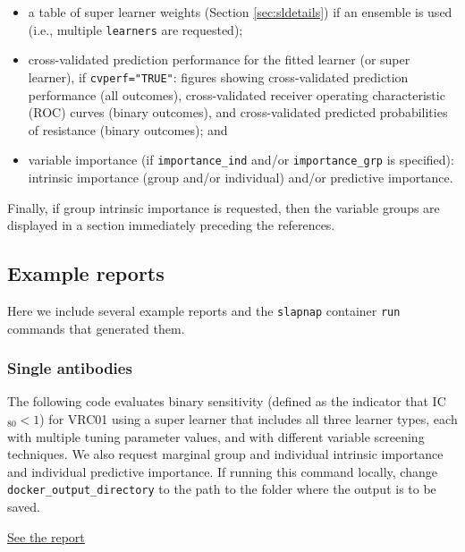 \documentclass[]{article}
\providecommand{\tightlist}{%
  \setlength{\itemsep}{0pt}\setlength{\parskip}{0pt}}
\begin{document}
\begin{itemize}
\tightlist
\item
  a table of super learner weights (Section \ref{sec:sldetails}) if an
  ensemble is used (i.e., multiple \texttt{learners} are requested);
\item
  cross-validated prediction performance for the fitted learner (or
  super learner), if \texttt{cvperf="TRUE"}: figures showing
  cross-validated prediction performance (all outcomes), cross-validated
  receiver operating characteristic (ROC) curves (binary outcomes), and
  cross-validated predicted probabilities of resistance (binary
  outcomes); and
\item
  variable importance (if \texttt{importance\_ind} and/or
  \texttt{importance\_grp} is specified): intrinsic importance (group
  and/or individual) and/or predictive importance.
\end{itemize}

Finally, if group intrinsic importance is requested, then the variable
groups are displayed in a section immediately preceding the references.

\subsection{Example reports}\label{example-reports}

Here we include several example reports and the \texttt{slapnap}
container \texttt{run} commands that generated them.

\subsubsection{Single antibodies}\label{single-antibodies}

The following code evaluates binary sensitivity (defined as the
indicator that IC\(_{80} < 1\)) for VRC01 using a super learner that
includes all three learner types, each with multiple tuning parameter
values, and with different variable screening techniques. We also
request marginal group and individual intrinsic importance and
individual predictive importance. If running this command locally,
change \texttt{docker\_output\_directory} to the path to the folder
where the output is to be saved.

\href{reports/report_VRC01.html}{See the report}
\end{document}
